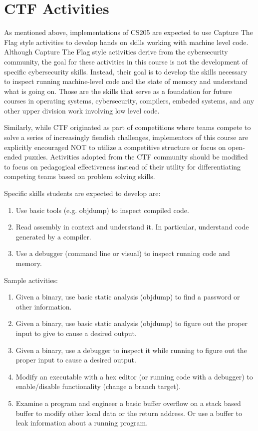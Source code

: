 \documentclass[12pt,letterpaper]{article}
\begin{document}
	
	\section{CTF Activities}

	As mentioned above, implementations of CS205 are expected to use Capture The Flag style activities to develop hands on skills working with machine level code. Although Capture The Flag style activities derive from the cybersecurity community, the goal for these activities in this course is not the development of specific cybersecurity skills. Instead, their goal is to develop the skills necessary to inspect running machine-level code and the state of memory and understand what is going on. Those are the skills that serve as a foundation for future courses in operating systems, cybersecurity, compilers, embeded systems, and any other upper division work involving low level code.

	Similarly, while CTF originated as part of competitions where teams compete to solve a series of increasingly fiendish challenges, implementors of this course are explicitly encouraged NOT to utilize a competitive structure or focus on open-ended puzzles. Activities adopted from the CTF community should be modified to focus on pedagogical effectiveness instead of their utility for differentiating competing teams based on problem solving skills.

	Specific skills students are expected to develop are:

	\begin{enumerate}
		\item Use basic tools (e.g. objdump) to inspect compiled code.
		\item Read assembly in context and understand it. In particular, understand code generated by a compiler.
		\item Use a debugger (command line or visual) to inspect running code and memory.
	\end{enumerate}

	Sample activities:

	\begin{enumerate}
		\item Given a binary, use basic static analysis (objdump) to find a password or other information.
		\item Given a binary, use basic static analysis (objdump) to figure out the proper input to give to cause a desired output. 
		\item Given a binary, use a debugger to inspect it while running to figure out the proper input to cause a desired output. 
		\item Modify an executable with a hex editor (or running code with a debugger) to enable/disable functionality (change a branch target).
		\item Examine a program and engineer a basic buffer overflow on a stack based buffer to modify other local data or the return address. Or use a buffer to leak information about a running program. 
	\end{enumerate}
\end{document}
